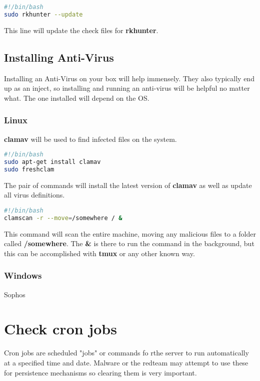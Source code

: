 \documentclass{article}
\begin{document}
\begin{lstlisting}[language=bash]
#!/bin/bash
sudo rkhunter --update
\end{lstlisting}

This line will update the check files for \textbf{rkhunter}.

\subsection{Installing Anti-Virus}
Installing an Anti-Virus on your box will help immensely. They also typically end
up as an inject, so installing and running an anti-virus will be helpful no matter
what. The one installed will depend on the OS.

\subsubsection{Linux}
\textbf{clamav} will be used to find infected files on the system.

\begin{lstlisting}[language=bash]
#!/bin/bash
sudo apt-get install clamav
sudo freshclam
\end{lstlisting}

The pair of commands will install the latest version of \textbf{clamav} as well as
update all virus definitions.

\begin{lstlisting}[language=bash]
#!/bin/bash
clamscan -r --move=/somewhere / &
\end{lstlisting}

This command will scan the entire machine, moving any malicious files to a folder
called \textbf{/somewhere}. The \textbf{\&} is there to run the command in the 
background, but this can be accomplished with \textbf{tmux} or any other known way.

\subsubsection{Windows}
Sophos


\section{Check cron jobs}
Cron jobs are scheduled "jobs" or commands fo rthe server to run automatically at
a specified time and date. Malware or the redteam may attempt to use these for
persistence mechanisms so clearing them is very important.
\end{document}
